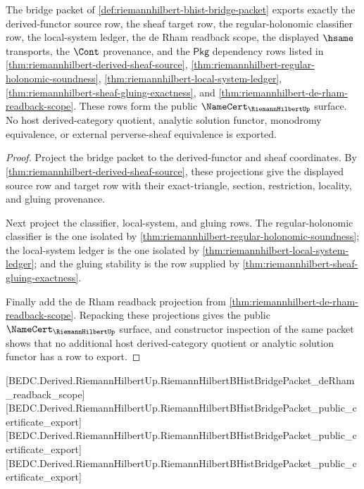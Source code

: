 \begin{theorem}
\label{thm:riemannhilbert-public-certificate-export}
The bridge packet of \autoref{def:riemannhilbert-bhist-bridge-packet} exports exactly the derived-functor source row, the sheaf target row, the regular-holonomic classifier row, the local-system ledger, the de Rham readback scope, the displayed $\hsame$ transports, the $\Cont$ provenance, and the $\mathsf{Pkg}$ dependency rows listed in \autoref{thm:riemannhilbert-derived-sheaf-source}, \autoref{thm:riemannhilbert-regular-holonomic-soundness}, \autoref{thm:riemannhilbert-local-system-ledger}, \autoref{thm:riemannhilbert-sheaf-gluing-exactness}, and \autoref{thm:riemannhilbert-de-rham-readback-scope}. These rows form the public $\NameCert_{\RiemannHilbertUp}$ surface. No host derived-category quotient, analytic solution functor, monodromy equivalence, or external perverse-sheaf equivalence is exported.
\end{theorem}
\begin{proof}
Project the bridge packet to the derived-functor and sheaf coordinates. By \autoref{thm:riemannhilbert-derived-sheaf-source}, these projections give the displayed source row and target row with their exact-triangle, section, restriction, locality, and gluing provenance.

Next project the classifier, local-system, and gluing rows. The regular-holonomic classifier is the one isolated by \autoref{thm:riemannhilbert-regular-holonomic-soundness}; the local-system ledger is the one isolated by \autoref{thm:riemannhilbert-local-system-ledger}; and the gluing stability is the row supplied by \autoref{thm:riemannhilbert-sheaf-gluing-exactness}.

Finally add the de Rham readback projection from \autoref{thm:riemannhilbert-de-rham-readback-scope}. Repacking these projections gives the public $\NameCert_{\RiemannHilbertUp}$ surface, and constructor inspection of the same packet shows that no additional host derived-category quotient or analytic solution functor has a row to export.
\end{proof}

[BEDC.Derived.RiemannHilbertUp.RiemannHilbertBHistBridgePacket\_deRham\_readback\_scope]
[BEDC.Derived.RiemannHilbertUp.RiemannHilbertBHistBridgePacket\_public\_certificate\_export]
[BEDC.Derived.RiemannHilbertUp.RiemannHilbertBHistBridgePacket\_public\_certificate\_export]
[BEDC.Derived.RiemannHilbertUp.RiemannHilbertBHistBridgePacket\_public\_certificate\_export]


